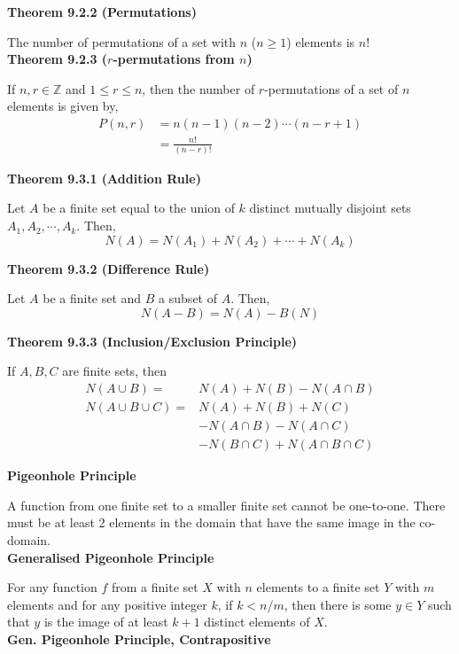 \documentclass[a4paper]{article}
\newcommand{\subheading}[1]{{\scriptsize\textbf{#1}}}
\begin{document}
\begin{multicols*}{4}
\subheading{Theorem 9.2.2 (Permutations)}

The number of permutations of a set with $n$ ($n \geq 1$) elements is $n!$\\

\subheading{Theorem 9.2.3 ($r$-permutations from $n$)}

If $n, r \in \mathbb{Z}$ and $1 \leq r \leq n$, then the number of
$r$-permutations of a set of $n$ elements is given by,
\begin{align*}
  P(n, r) &= n(n-1)(n-2)\cdots(n-r+1) \\
          &= \frac{n!}{(n-r)!}
\end{align*}

\subheading{Theorem 9.3.1 (Addition Rule)}

Let $A$ be a finite set equal to the union of $k$ distinct mutually disjoint
sets $A_1, A_2, \cdots, A_k$. Then, $$N(A) = N(A_1) + N(A_2) + \cdots + N(A_k)$$

\subheading{Theorem 9.3.2 (Difference Rule)}

Let $A$ be a finite set and $B$ a subset of $A$. Then,
$$N(A-B) = N(A) - B(N)$$

\subheading{Theorem 9.3.3 (Inclusion/Exclusion Principle)}

If $A, B, C$ are finite sets, then
\begin{align*}
  N(A \cup B) = &N(A) + N(B) - N(A \cap B) \\
  N(A \cup B \cup C) = &N(A) + N(B) + N(C) \\
    &-N(A \cap B) - N(A \cap C)\\
    &- N(B \cap C)+ N(A \cap B \cap C)
\end{align*}

\subheading{Pigeonhole Principle}

A function from one finite set to a smaller finite set cannot be one-to-one.
There must be at least 2 elements in the domain that have the same image in the
co-domain.\\

\subheading{Generalised Pigeonhole Principle}

For any function $f$ from a finite set $X$ with $n$ elements to a finite set $Y$
with $m$ elements and for any positive integer $k$, if $k < n/m$, then there is
some $y \in Y$ such that $y$ is the image of at least $k + 1$ distinct elements
of $X$.\\

\subheading{Gen. Pigeonhole Principle, Contrapositive}


\end{multicols*}
\end{document}
